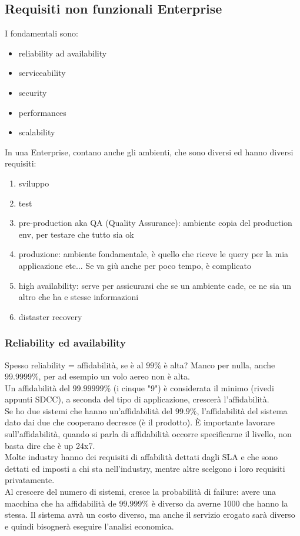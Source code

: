 \documentclass{article}
\begin{document}
\subsection{Requisiti non funzionali Enterprise}
I fondamentali sono:
\begin{itemize}
\item reliability ad availability
\item serviceability
\item security
\item performances
\item scalability
\end{itemize}
In una Enterprise, contano anche gli ambienti, che sono diversi ed hanno diversi requisiti:
\begin{enumerate}
\item sviluppo
\item test
\item pre-production aka QA (Quality Assurance): ambiente copia del production env, per testare che tutto sia ok
\item produzione: ambiente fondamentale, è quello che riceve le query per la mia applicazione etc... Se va giù anche per poco tempo, è complicato
\item high availability: serve per assicurarsi che se un ambiente cade, ce ne sia un altro che ha e stesse informazioni
\item distaster recovery
\end{enumerate}
\subsubsection{Reliability ed availability}
Spesso reliability = affidabilità, se è al $99\%$ è alta? Manco per nulla, anche $99.9999\%$, per ad esempio un volo aereo non è alta.\\ Un affidabilità del $99.99999\%$ (i cinque "9") è considerata il minimo (rivedi appunti SDCC), a seconda del tipo di applicazione, crescerà l'affidabilità.\\ Se ho due sistemi che hanno un'affidabilità del $99.9\%$, l'affidabilità del sistema dato dai due che cooperano decresce (è il prodotto). È importante lavorare sull'affidabilità, quando si parla di affidabilità occorre specificarne il livello, non basta dire che è up 24x7.\\ Molte industry hanno dei requisiti di affabilità dettati dagli SLA e che sono dettati ed imposti a chi sta nell'industry, mentre altre scelgono i loro requisiti privatamente.\\ Al crescere del numero di sistemi, cresce la probabilità di failure: avere una macchina che ha affidabilità de $99.999\%$ è diverso da averne 1000 che hanno la stessa. Il sistema avrà un costo diverso, ma anche il servizio erogato sarà diverso e quindi bisognerà eseguire l'analisi economica.
\end{document}
